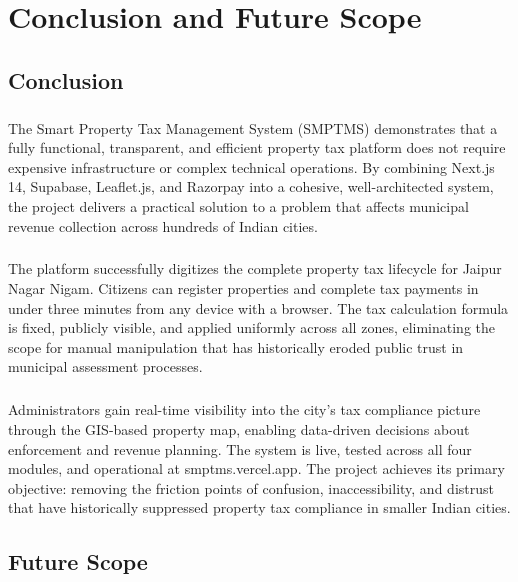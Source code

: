 \chapter{Conclusion and Future Scope}
\section{Conclusion}
\paragraph{}The Smart Property Tax Management System (SMPTMS) demonstrates that a fully functional, transparent, and efficient property tax platform does not require expensive infrastructure or complex technical operations. By combining Next.js 14, Supabase, Leaflet.js, and Razorpay into a cohesive, well-architected system, the project delivers a practical solution to a problem that affects municipal revenue collection across hundreds of Indian cities.

\paragraph{}The platform successfully digitizes the complete property tax lifecycle for Jaipur Nagar Nigam. Citizens can register properties and complete tax payments in under three minutes from any device with a browser. The tax calculation formula is fixed, publicly visible, and applied uniformly across all zones, eliminating the scope for manual manipulation that has historically eroded public trust in municipal assessment processes.

\paragraph{}Administrators gain real-time visibility into the city's tax compliance picture through the GIS-based property map, enabling data-driven decisions about enforcement and revenue planning. The system is live, tested across all four modules, and operational at smptms.vercel.app. The project achieves its primary objective: removing the friction points of confusion, inaccessibility, and distrust that have historically suppressed property tax compliance in smaller Indian cities.

\section{Future Scope}
